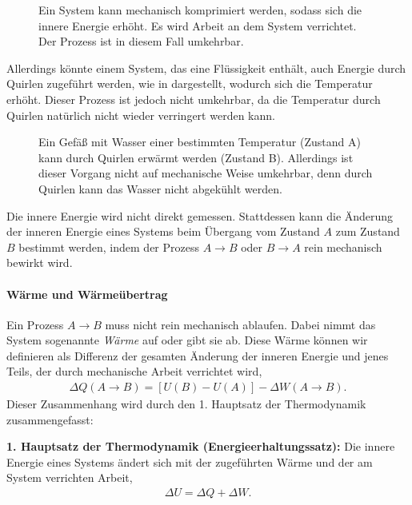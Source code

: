 \begin{figure}[htbp]
    \centering
    \tfigRectangularBoxWithPiston
    \caption{Ein System kann mechanisch komprimiert werden, sodass sich die innere Energie erhöht. Es wird Arbeit an dem System verrichtet. Der Prozess ist in diesem Fall umkehrbar. }
    \label{fig:RectangularBoxWithPiston}
\end{figure}

Allerdings könnte einem System, das eine Flüssigkeit enthält, auch Energie durch Quirlen zugeführt werden, wie in  dargestellt, wodurch sich die Temperatur erhöht. Dieser Prozess ist jedoch nicht umkehrbar, da die Temperatur durch Quirlen natürlich nicht wieder verringert werden kann.

\begin{figure}[htbp]
    \centering
    \tfigWaterStiringIceCubes
    \caption{Ein Gefäß mit Wasser einer bestimmten Temperatur (Zustand A) kann durch Quirlen erwärmt werden (Zustand B). Allerdings ist dieser Vorgang nicht auf mechanische Weise umkehrbar, denn durch Quirlen kann das Wasser nicht abgekühlt werden. }
    \label{fig:WaterStiringIceCubes}
\end{figure}

\begin{formal}
    Die innere Energie wird nicht direkt gemessen. Stattdessen kann die Änderung der inneren Energie eines Systems beim Übergang vom Zustand $A$ zum Zustand $B$ bestimmt werden, indem der Prozess $A\rightarrow B$ oder $B\rightarrow A$ rein mechanisch bewirkt wird.
\end{formal}



\paragraph*{Wärme und Wärmeübertrag}

Ein Prozess $A\rightarrow B$ muss nicht rein mechanisch ablaufen. Dabei nimmt das System sogenannte \emph{Wärme} auf oder gibt sie ab. Diese Wärme können wir definieren als Differenz der gesamten Änderung der inneren Energie und jenes Teils, der durch mechanische Arbeit verrichtet wird,
\begin{align*}
    \Delta Q(A\rightarrow B) = [U(B)-U(A)] - \Delta W(A\rightarrow B).
\end{align*}
Dieser Zusammenhang wird durch den 1. Hauptsatz der Thermodynamik zusammengefasst:
\begin{formal}
    \textbf{1. Hauptsatz der Thermodynamik (Energieerhaltungssatz):}
    \label{hs:erster}
    Die innere Energie eines Systems ändert sich mit der zugeführten Wärme und der am System verrichten Arbeit,
    \begin{align*}
        \Delta U = \Delta Q + \Delta W.
    \end{align*}
\end{formal}

